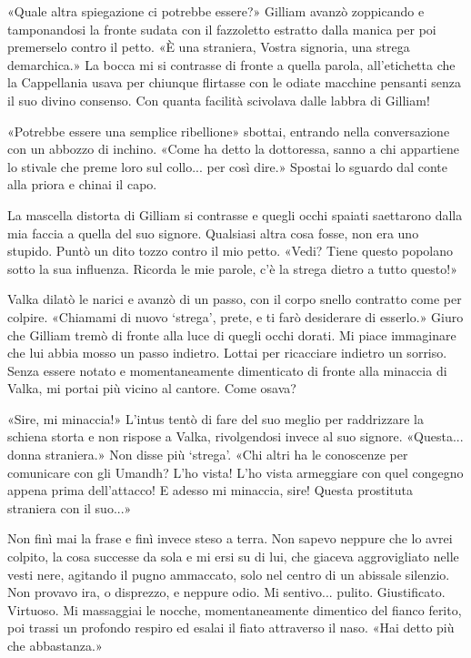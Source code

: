 «Quale altra spiegazione ci potrebbe essere?» Gilliam avanzò zoppicando
e tamponandosi la fronte sudata con il fazzoletto estratto dalla manica
per poi premerselo contro il petto. «È una straniera, Vostra signoria,
una strega demarchica.» La bocca mi si contrasse di fronte a quella
parola, all'etichetta che la Cappellania usava per chiunque flirtasse
con le odiate macchine pensanti senza il suo divino consenso. Con quanta
facilità scivolava dalle labbra di Gilliam!

«Potrebbe essere una semplice ribellione» sbottai, entrando nella
conversazione con un abbozzo di inchino. «Come ha detto la dottoressa,
sanno a chi appartiene lo stivale che preme loro sul collo... per così
dire.» Spostai lo sguardo dal conte alla priora e chinai il capo.

La mascella distorta di Gilliam si contrasse e quegli occhi spaiati
saettarono dalla mia faccia a quella del suo signore. Qualsiasi altra
cosa fosse, non era uno stupido. Puntò un dito tozzo contro il mio
petto. «Vedi? Tiene questo popolano sotto la sua influenza. Ricorda le
mie parole, c'è la strega dietro a tutto questo!»

Valka dilatò le narici e avanzò di un passo, con il corpo snello
contratto come per colpire. «Chiamami di nuovo `strega', prete, e ti
farò desiderare di esserlo.» Giuro che Gilliam tremò di fronte alla luce
di quegli occhi dorati. Mi piace immaginare che lui abbia mosso un passo
indietro. Lottai per ricacciare indietro un sorriso. Senza essere notato
e momentaneamente dimenticato di fronte alla minaccia di Valka, mi
portai più vicino al cantore. Come osava?

«Sire, mi minaccia!» L'intus tentò di fare del suo meglio per
raddrizzare la schiena storta e non rispose a Valka, rivolgendosi invece
al suo signore. «Questa... donna straniera.» Non disse più `strega'.
«Chi altri ha le conoscenze per comunicare con gli Umandh? L'ho vista!
L'ho vista armeggiare con quel congegno appena prima dell'attacco! E
adesso mi minaccia, sire! Questa prostituta straniera con il suo...»

Non finì mai la frase e finì invece steso a terra. Non sapevo {neppure}
che lo avrei colpito, la cosa successe da sola e mi ersi su di lui, che
giaceva aggrovigliato nelle vesti nere, agitando il pugno ammaccato,
solo nel centro di un abissale silenzio. Non provavo ira, o disprezzo, e
neppure odio. Mi sentivo... pulito. Giustificato. Virtuoso. Mi
massaggiai le nocche, momentaneamente dimentico del fianco ferito, poi
trassi un profondo respiro ed esalai il fiato attraverso il naso. «Hai
detto più che abbastanza.»

